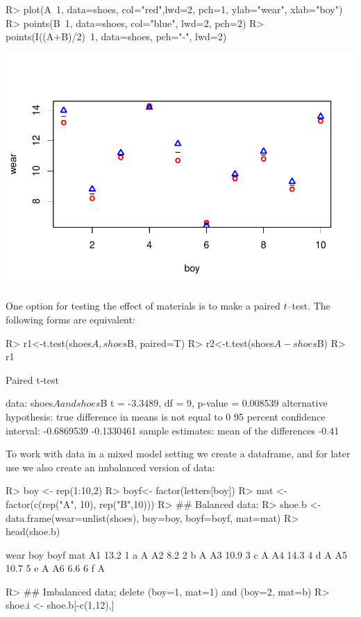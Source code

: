 \documentclass[11pt]{article}
\begin{document}
\begin{Schunk}
\begin{Sinput}
R> plot(A~1, data=shoes, col="red",lwd=2, pch=1, ylab="wear", xlab="boy")
R> points(B~1, data=shoes, col="blue", lwd=2, pch=2)
R> points(I((A+B)/2)~1, data=shoes, pch="-", lwd=2)
\end{Sinput}
\end{Schunk}
\includegraphics{figures/pbkr-005}


One option for testing the effect of materials is to make a paired
$t$--test. The following forms are equivalent:

\begin{Schunk}
\begin{Sinput}
R> r1<-t.test(shoes$A, shoes$B, paired=T)
R> r2<-t.test(shoes$A-shoes$B)
R> r1
\end{Sinput}
\begin{Soutput}
	Paired t-test

data:  shoes$A and shoes$B
t = -3.3489, df = 9, p-value = 0.008539
alternative hypothesis: true difference in means is not equal to 0
95 percent confidence interval:
 -0.6869539 -0.1330461
sample estimates:
mean of the differences 
                  -0.41 
\end{Soutput}
\end{Schunk}


To work with data in a mixed model setting we create a dataframe, and
for later use we also create an imbalanced version of data:

\begin{Schunk}
\begin{Sinput}
R> boy <- rep(1:10,2)
R> boyf<- factor(letters[boy])
R> mat <- factor(c(rep("A", 10), rep("B",10)))
R> ## Balanced data:
R> shoe.b <- data.frame(wear=unlist(shoes), boy=boy, boyf=boyf, mat=mat)
R> head(shoe.b)
\end{Sinput}
\begin{Soutput}
   wear boy boyf mat
A1 13.2   1    a   A
A2  8.2   2    b   A
A3 10.9   3    c   A
A4 14.3   4    d   A
A5 10.7   5    e   A
A6  6.6   6    f   A
\end{Soutput}
\begin{Sinput}
R> ## Imbalanced data; delete (boy=1, mat=1) and (boy=2, mat=b)
R> shoe.i <-  shoe.b[-c(1,12),]
\end{Sinput}
\end{Schunk}
\end{document}
